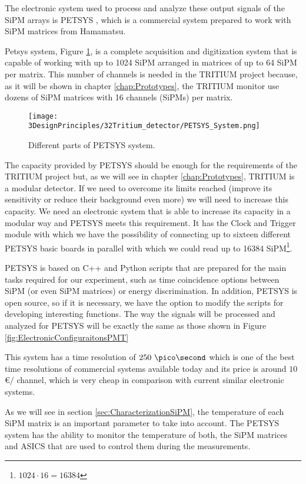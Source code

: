 The electronic system used to process and analyze these output signals of the SiPM arrays is PETSYS \cite{PETSYS}, which is a commercial system prepared to work with SiPM matrices from Hamamatsu.

Petsys system, Figure \ref{fig:PETSYS}, is a complete acquisition and digitization system that is capable of working with up to 1024 SiPM arranged in matrices of up to 64 SiPM per matrix. This number of channels is needed in the TRITIUM project because, as it will be shown in chapter \ref{chap:Prototypes}, the TRITIUM monitor use dozens of SiPM matrices with 16 channels (SiPMs) per matrix.

\begin{figure}[htbp]
\centering
\texttt{[image: 3DesignPrinciples/32Tritium\_detector/PETSYS\_System.png]}
\caption{Different parts of PETSYS system.\label{fig:PETSYS}~\cite{PETSYS}}
\end{figure}

The capacity provided by PETSYS should be enough for the requirements of the TRITIUM project but, as we will see in chapter \ref{chap:Prototypes}, TRITIUM is a modular detector. If we need to overcome its limits reached (improve its sensitivity or reduce their background even more) we will need to increase this capacity. We need an electronic system that is able to increase its capacity in a modular way and PETSYS meets this requirement. It has the Clock and Trigger module with which we have the possibility of connecting up to sixteen different PETSYS basic boards in parallel with which we could read up to 16384 SiPM\footnote{$1024\cdot{}16 = 16384$}.

PETSYS is based on C++ and Python scripts that are prepared for the main tasks required for our experiment, such as time coincidence options between SiPM (or even SiPM matrices) or energy discrimination. In addition, PETSYS is open source, so if it is necessary, we have the option to modify the scripts for developing interesting functions. The way the signals will be processed and analyzed for PETSYS will be exactly the same as those shown in Figure \ref{fig:ElectronicConfiguraitonsPMT}

This system has a time resolution of $250~\pico\second$ which is one of the best time resolutions of commercial systems available today and its price is around $10$\euro$/$ channel, which is very cheap in comparison with current similar electronic systems.

As we will see in section \ref{sec:CharacterizationSiPM}, the temperature of each SiPM matrix is an important parameter to take into account. The PETSYS system has the ability to monitor the temperature of both, the SiPM matrices and ASICS that are used to control them during the measurements.

